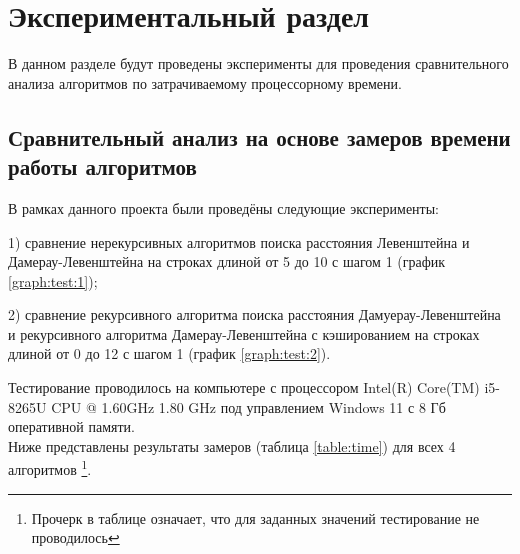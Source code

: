 \chapter{Экспериментальный раздел}
\label{cha:research}
    В данном разделе будут проведены эксперименты для проведения 
    сравнительного анализа алгоритмов по затрачиваемому процессорному 
    времени.

    \section{Сравнительный анализ на основе замеров времени работы алгоритмов}
        В рамках данного проекта были проведёны следующие эксперименты:

        1) сравнение нерекурсивных алгоритмов поиска расстояния Левенштейна и Дамерау-Левенштейна
        на строках длиной от 5 до 10 с шагом 1 (график \ref{graph:test:1});
        
        2) сравнение рекурсивного алгоритма поиска расстояния Дамуерау-Левенштейна и рекурсивного алгоритма Дамерау-Левенштейна с кэшированием на строках длиной от 0 до 12 с шагом 1 (график \ref{graph:test:2}).
        
        Тестирование проводилось на компьютере с процессором
        Intel(R) Core(TM) i5-8265U CPU @ 1.60GHz 1.80 GHz под управлением Windows 11 с 8 Гб оперативной памяти.\\

        Ниже представлены результаты замеров (таблица \ref{table:time}) для всех 4 алгоритмов \footnote{Прочерк в таблице означает, что для заданных значений тестирование не проводилось}.\\


